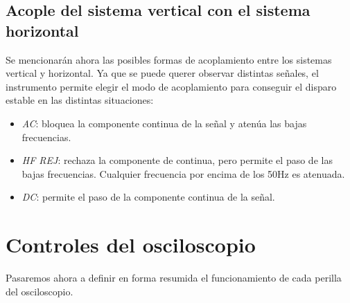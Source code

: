 \documentclass{article}
\begin{document}
\subsection{Acople del sistema vertical con el sistema horizontal}

	Se mencionarán ahora las posibles formas de acoplamiento entre los sistemas vertical y horizontal. Ya que se puede querer observar distintas señales, el instrumento permite elegir el modo de acoplamiento para conseguir el disparo estable en las distintas situaciones:
\medskip

\begin{itemize}
	\item \textit{AC}: bloquea la componente continua de la señal y atenúa las bajas frecuencias.
	\item \textit{HF REJ}: rechaza la componente de continua, pero permite el paso de las bajas frecuencias. Cualquier frecuencia por encima de los 50Hz es atenuada.
	\item \textit{DC}: permite el paso de la componente continua de la señal.

\end{itemize}
\bigskip\bigskip




\section{Controles del osciloscopio}

	Pasaremos ahora a definir en forma resumida el funcionamiento de cada perilla del osciloscopio. 
\bigskip
\end{document}
